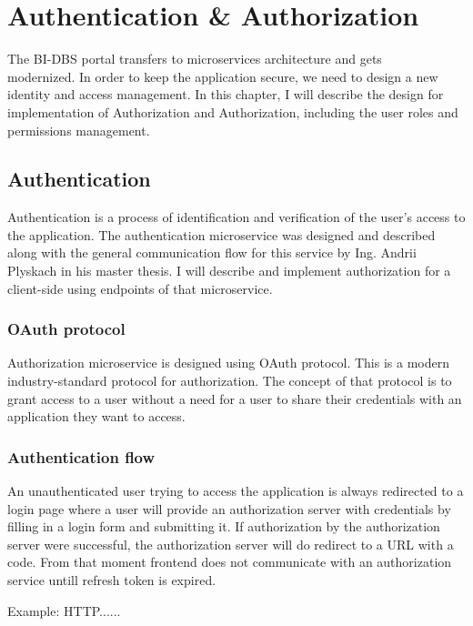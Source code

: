 \chapter{Authentication \& Authorization}

The BI-DBS portal transfers to microservices architecture and gets \\  
 modernized. In order to keep the application secure, we need to design a new identity and access management. In this chapter, I will describe the design for implementation of Authorization and Authorization, including the user roles and permissions management.

\section{Authentication}\label{sec:authentication}

Authentication is a process of identification and verification of the user's access to the application. The authentication microservice was designed and described along with the general communication flow for this service by Ing. Andrii Plyskach in his master thesis. I will describe and implement authorization for a client-side using endpoints of that microservice.


\subsection{OAuth protocol}
Authorization microservice is designed using OAuth protocol. This is a modern industry-standard protocol for authorization. The concept of that protocol is to grant access to a user without a need for a user to share their credentials with an application they want to access.

 
 \subsection{Authentication flow}
 An unauthenticated user trying to access the application is always redirected to a login page where a user will provide an authorization server with credentials by filling in a login form and submitting it. If authorization by the authorization server were successful, the authorization server will do redirect to a URL with a code. From that moment frontend does not communicate with an authorization service untill refresh token is expired.



Example: HTTP......

